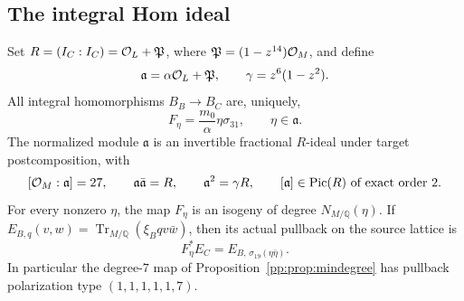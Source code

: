 \subsection{The integral Hom ideal}
\begin{proposition}
\label{pp:prop:homideal}
Set $R=(I_C:I_C)=\mathcal O_L+\mathfrak P$, where
$\mathfrak P=(1-z^{14})\mathcal O_M$, and define
\[
 \mathfrak a=\alpha\mathcal O_L+\mathfrak P,
 \qquad \gamma=z^6(1-z^2).
\]
All integral homomorphisms $B_B\to B_C$ are, uniquely,
\[
 F_\eta=\frac{m_0}{\alpha}\eta\sigma_{31},\qquad
 \eta\in\mathfrak a.
\]
The normalized module $\mathfrak a$ is an invertible fractional
$R$-ideal under target postcomposition, with
\[
 [\mathcal O_M:\mathfrak a]=27,
 \qquad \mathfrak a\bar{\mathfrak a}=R,
 \qquad \mathfrak a^2=\gamma R,
 \qquad [\mathfrak a]\in\operatorname{Pic}(R)
       \text{ of exact order }2.
\]
For every nonzero $\eta$, the map $F_\eta$ is an isogeny of degree
$N_{M/\mathbb Q}(\eta)$. If
$E_{B,q}(v,w)=\operatorname{Tr}_{M/\mathbb Q}(\xi_B qv\bar w)$,
then its actual pullback on the source lattice is
\[
 F_\eta^*E_C=E_{B,\,\sigma_{19}(\eta\bar\eta)}.
\]
In particular the degree-$7$ map of Proposition~\ref{pp:prop:mindegree}
has pullback polarization type $(1,1,1,1,1,7)$.
\end{proposition}

